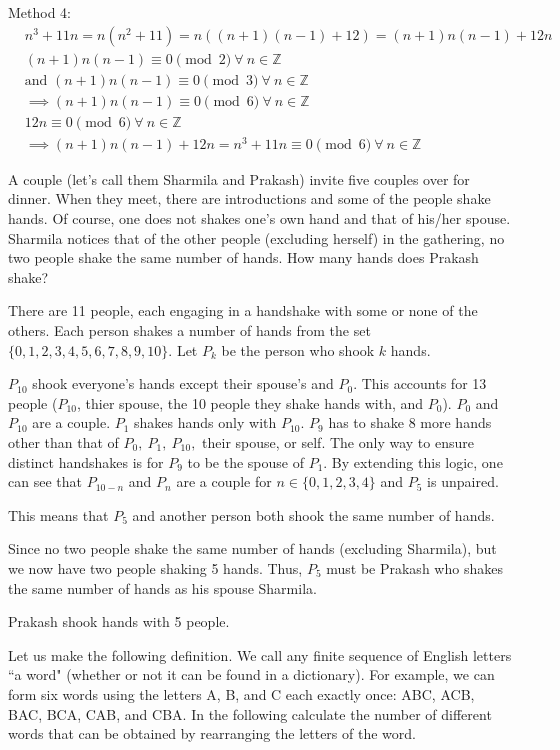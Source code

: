 \documentclass[12pt,answers]{exam}
\begin{document}
\begin{questions}
\begin{solution}
        Method 4:
        \[
            \begin{aligned}
        &n^3+11n = n(n^2 + 11) = n((n+1)(n-1)+12)= (n+1)n(n-1) + 12n\\
        &(n+1)n(n-1) \equiv 0 \pmod{2}\ \forall\ n \in \mathbb{Z}\\
        &\text{and } (n+1)n(n-1) \equiv 0 \pmod{3}\ \forall\ n \in \mathbb{Z}\\
        &\implies (n+1)n(n-1) \equiv 0 \pmod{6}\ \forall\ n \in \mathbb{Z}\\
        &12n \equiv 0 \pmod{6}\ \forall\ n \in \mathbb{Z}\\
        &\implies (n+1)n(n-1) + 12n = n^3+11n \equiv 0 \pmod{6}\ \forall\ n \in \mathbb{Z}
            \end{aligned}
            \]
\end{solution}
\question A couple (let's call them Sharmila and Prakash) invite five couples over for dinner. When they meet, there are introductions and some of the people shake hands. Of course, one does not shakes one's own hand and that of his/her spouse. Sharmila notices that of the other people (excluding herself) in the gathering, no two people shake the same number of hands. How many hands does Prakash shake?
\begin{solution}
    There are 11 people, each engaging in a handshake with some or none of the others. Each person shakes a number of hands from the set \(\{0,1,2,3,4,5,6,7,8,9,10\}\). Let $P_k$ be the person who shook $k$ hands. 
    
    $P_{10}$ shook everyone's hands except their spouse's and $P_{0}$. This accounts for 13 people ($P_{10}$, thier spouse, the 10 people they shake hands with, and $P_{0}$). $P_0$ and $P_{10}$ are a couple. $P_1$ shakes hands only with $P_{10}$. $P_{9}$ has to shake 8 more hands other than that of $P_0,\ P_1,\ P_{10},$ their spouse, or self. The only way to ensure distinct handshakes is for $P_9$ to be the spouse of $P_1$.
    By extending this logic, one can see that $P_{10-n}$ and $P_n$ are a couple for \(n\in\{0,1,2,3,4\}\) and $P_5$ is unpaired. 

    This means that $P_5$ and another person both shook the same number of hands. 
    
    Since no two people shake the same number of hands (excluding Sharmila), but we now have two people shaking 5 hands. Thus, $P_5$ must be Prakash who shakes the same number of hands as his spouse Sharmila.

    Prakash shook hands with 5 people. 
\end{solution}
\question Let us make the following definition. We call any finite sequence of English letters ``a word" (whether or not it can be found in a dictionary). For example, we can form six words using the letters A, B, and C each exactly once: ABC, ACB, BAC, BCA, CAB, and CBA. In the following calculate the number of different words that can be obtained by rearranging the letters of the word.
\begin{parts}

\end{parts}
\end{questions}
\end{document}
